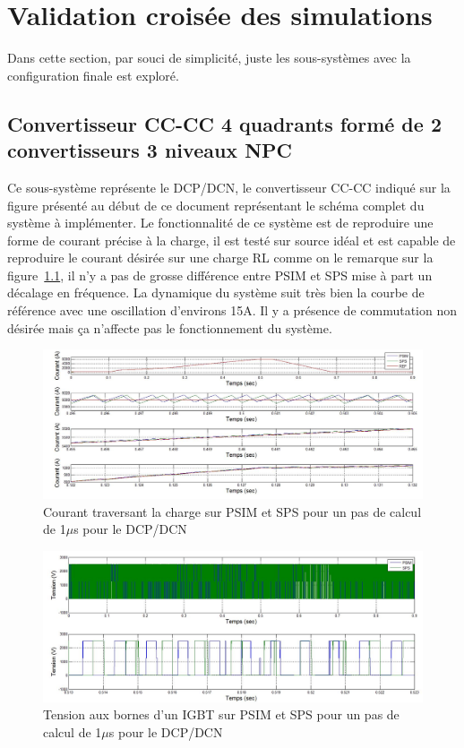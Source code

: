 \chapter{Validation croisée des simulations}
Dans cette section, par souci de simplicité, juste les sous-systèmes avec la configuration finale est exploré. 

\section{Convertisseur CC-CC 4 quadrants formé de 2 convertisseurs 3 niveaux NPC}
Ce sous-système représente le DCP/DCN, le convertisseur CC-CC indiqué sur la figure présenté au début de ce document représentant le schéma complet du système à implémenter. Le fonctionnalité de ce système est de reproduire une forme de courant précise à la charge, il est testé sur source idéal et est capable de  reproduire le courant désirée sur une charge RL comme on le remarque sur la figure~\ref{DC_ch_cou_1}, il n'y a pas de grosse différence entre PSIM et SPS mise à part un décalage en fréquence. La dynamique du système suit très bien la courbe de référence avec une oscillation d'environs 15A. Il y a présence de commutation non désirée mais ça n'affecte pas le fonctionnement du système. 



\begin{figure}[htb]
\centering
\includegraphics[scale=0.5]{fig/DCPDCN/DCPCourantCharge1u.jpg}
\caption{Courant traversant la charge sur PSIM et SPS pour un pas de calcul de 1$\mu$s pour le DCP/DCN}
\label{DC_ch_cou_1}
\end{figure}

\begin{figure}[htb]
\centering
\includegraphics[scale=0.5]{fig/DCPDCN/DCPTensionIGBT1u.jpg}
\caption{Tension aux bornes d'un IGBT sur PSIM et SPS pour un pas de calcul de 1$\mu$s pour le DCP/DCN}
\label{DC_IG_ten_1}
\end{figure}

